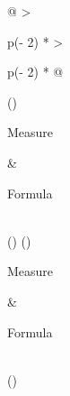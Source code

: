 \documentclass[
]{book}
\begin{document}
\begin{longtable}[]{@{}
  >{\raggedright\arraybackslash}p{(\columnwidth - 2\tabcolsep) * }
  >{\raggedright\arraybackslash}p{(\columnwidth - 2\tabcolsep) * }@{}}
\caption{\label{tab:variation} Common measures of variation. \(N\) refers to the number of data points.}\tabularnewline
\toprule()
\begin{minipage}[b]{\linewidth}\raggedright
Measure
\end{minipage} & \begin{minipage}[b]{\linewidth}\raggedright
Formula
\end{minipage} \\
\midrule()
\endfirsthead
\toprule()
\begin{minipage}[b]{\linewidth}\raggedright
Measure
\end{minipage} & \begin{minipage}[b]{\linewidth}\raggedright
Formula
\end{minipage} \\
\midrule()
\endhead

\end{longtable}
\end{document}
